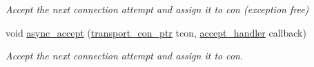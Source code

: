 \begin{DoxyCompactItemize}
\begin{DoxyCompactList}\small\item\em Accept the next connection attempt and assign it to con (exception free) \end{DoxyCompactList}\item 
void \hyperlink{classwebsocketpp_1_1transport_1_1asio_1_1endpoint_a7e559e38bf344d60706f106db8b15d50}{async\+\_\+accept} (\hyperlink{classwebsocketpp_1_1transport_1_1asio_1_1endpoint_ac5fc306f32d15f92dd1b22366eaba62d}{transport\+\_\+con\+\_\+ptr} tcon, \hyperlink{namespacewebsocketpp_1_1transport_a9326ea831379368ee47841b2e46cb009}{accept\+\_\+handler} callback)
\begin{DoxyCompactList}\small\item\em Accept the next connection attempt and assign it to con. \end{DoxyCompactList}\end{DoxyCompactItemize}
